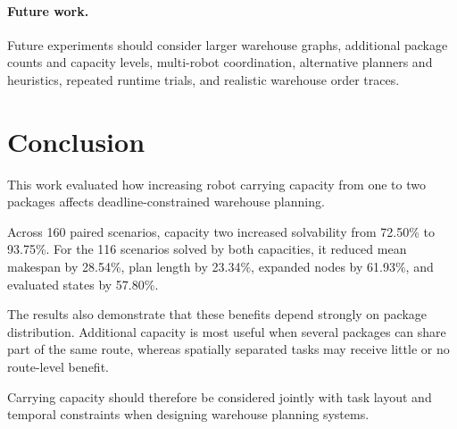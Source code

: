 \documentclass[conference]{IEEEtran}
\begin{document}
\paragraph{Future work.}
Future experiments should consider larger warehouse graphs, additional package
counts and capacity levels, multi-robot coordination, alternative planners and
heuristics, repeated runtime trials, and realistic warehouse order traces.

\section{Conclusion}

This work evaluated how increasing robot carrying capacity from one to two
packages affects deadline-constrained warehouse planning.

Across 160 paired scenarios, capacity two increased solvability from 72.50\%
to 93.75\%. For the 116 scenarios solved by both capacities, it reduced mean
makespan by 28.54\%, plan length by 23.34\%, expanded nodes by 61.93\%, and
evaluated states by 57.80\%.

The results also demonstrate that these benefits depend strongly on package
distribution. Additional capacity is most useful when several packages can
share part of the same route, whereas spatially separated tasks may receive
little or no route-level benefit.

Carrying capacity should therefore be considered jointly with task layout and
temporal constraints when designing warehouse planning systems.
\end{document}
